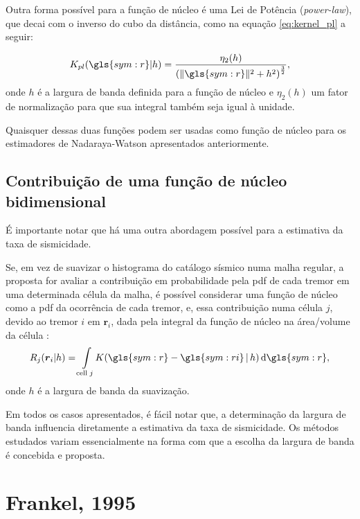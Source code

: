 Outra forma possível para a função de núcleo é uma Lei de Potência (\emph{power-law}), que decai com o 
inverso do cubo da distância, como na equação
\eqref{eq:kernel_pl} a seguir:

\begin{equation}
	\ensuremath{
		K_{pl}(\gls{sym:r}\arrowvert h) = 
			\frac{\eta_2(h)}
 				 {\left( \|\gls{sym:r}\|^2 + h^2 \right)^{\frac{3}{2}} },
 	}
\label{eq:kernel_pl}
\end{equation}
onde $h$ é a largura de banda definida para a função de núcleo e $\eta_2(h)$ um fator de normalização
para que sua integral também seja igual à unidade.


Quaisquer dessas duas funções podem ser usadas como função de núcleo 
para os estimadores de Nadaraya-Watson apresentados anteriormente.

\subsection{Contribuição de uma função de núcleo bidimensional}

É importante notar que há uma outra abordagem possível para a estimativa da taxa de sismicidade.

Se, em vez de suavizar o histograma do catálogo sísmico numa malha regular, a proposta for
avaliar a contribuição em probabilidade pela \gls{pdf} de cada tremor em uma determinada célula da malha, 
é possível considerar uma função de núcleo como a \gls{pdf} da ocorrência de cada tremor, e,
essa contribuição numa célula $j$, devido ao tremor $i$ em $\boldsymbol{r}_i$, dada pela integral da
função de núcleo na área/volume da célula \citep{zechar_2010-2}: 
\begin{equation}
	\ensuremath{
		R_{j}(\boldsymbol{r}_i \arrowvert h) = \int\limits_{\mathrm{cell}\;j}\!K( \gls{sym:r} -
		\gls{sym:ri}\,\arrowvert\,h)\,\mathrm{d}\gls{sym:r} },
\label{eq:kernel_int}
\end{equation}
onde $h$ é a largura de banda da suavização.


Em todos os casos apresentados, é fácil notar que, a determinação da largura de banda influencia diretamente
a estimativa da taxa de sismicidade. Os métodos estudados variam essencialmente 
na forma com que a escolha da largura de banda é concebida e proposta.



\section{Frankel, 1995}
\label{sec:frankel}

